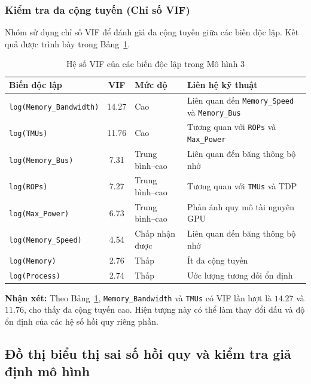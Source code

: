 \subsubsection{Kiểm tra đa cộng tuyến (Chỉ số VIF)}

Nhóm sử dụng chỉ số VIF để đánh giá đa cộng tuyến giữa các biến độc lập. Kết quả được trình bày trong Bảng~\ref{tab:vif-model3}.

\begin{table}[H]
\centering
\scriptsize
\renewcommand{\arraystretch}{1.1}
\setlength{\tabcolsep}{3pt}
\caption{Hệ số VIF của các biến độc lập trong Mô hình 3}
\label{tab:vif-model3}
\begin{tabularx}{\textwidth}{@{}p{3.1cm} c p{2.5cm} X@{}}
\toprule
\textbf{Biến độc lập} & \textbf{VIF} & \textbf{Mức độ} & \textbf{Liên hệ kỹ thuật} \\
\midrule
\texttt{log(Memory\_Bandwidth)} & 14.27 & Cao & Liên quan đến \texttt{Memory\_Speed} và \texttt{Memory\_Bus} \\
\texttt{log(TMUs)} & 11.76 & Cao & Tương quan với \texttt{ROPs} và \texttt{Max\_Power} \\
\texttt{log(Memory\_Bus)} & 7.31 & Trung bình--cao & Liên quan đến băng thông bộ nhớ \\
\texttt{log(ROPs)} & 7.27 & Trung bình--cao & Tương quan với \texttt{TMUs} và TDP \\
\texttt{log(Max\_Power)} & 6.73 & Trung bình--cao & Phản ánh quy mô tài nguyên GPU \\
\texttt{log(Memory\_Speed)} & 4.54 & Chấp nhận được & Liên quan đến băng thông bộ nhớ \\
\texttt{log(Memory)} & 2.76 & Thấp & Ít đa cộng tuyến \\
\texttt{log(Process)} & 2.74 & Thấp & Ước lượng tương đối ổn định \\
\bottomrule
\end{tabularx}
\end{table}

\textbf{Nhận xét:} Theo Bảng~\ref{tab:vif-model3}, \texttt{Memory\_Bandwidth} và \texttt{TMUs} có VIF lần lượt là $14.27$ và $11.76$, cho thấy đa cộng tuyến cao. Hiện tượng này có thể làm thay đổi dấu và độ ổn định của các hệ số hồi quy riêng phần.

\subsection{Đồ thị biểu thị sai số hồi quy và kiểm tra giả định mô hình}

